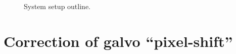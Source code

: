 \documentclass[ArticleMain.tex]{subfiles}
\begin{document}
\begin{figure}
\caption{System setup outline.}
\end{figure}
\part{Correction of galvo ``pixel-shift''}
\end{document}
